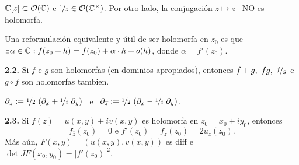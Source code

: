\begin{example}
    \(\mathbb{C}[z]\subset \mathcal{O}(\mathbb{C})\) e \(\nicefrac{1}{z} \in \mathcal{O}(\mathbb{C}^\times)\). Por otro lado, la conjugación \(z \mapsto \overline{z}\) \ NO es holomorfa. 
\end{example}

\begin{note}
    Una reformulación equivalente y útil de ser holomorfa en \(z_0\) es que \(\exists \alpha \in \mathbb{C} : f(z_0 + h) = f(z_0)+ \alpha\cdot h  + o(h) \), donde \(\alpha = f'(z_0)\). 
\end{note}

\begin{proposition}
    \textbf{2.2.} Si \(f\) e \(g\) son holomorfas (en dominios apropiados), entonces \(f+g, \ fg, \ \nicefrac{f}{g}\) e \(g \circ f\) son holomorfas tambien.  
\end{proposition}


\renewcommand{\hom}{\mathcal{L}}

\begin{definition}
    \(\displaystyle \partial_z := \nicefrac{1}{2} \ (\partial_x + \nicefrac{1}{i} \ \partial_y)\) \ e \ \(\displaystyle \partial_{\overline{z}} := \nicefrac{1}{2}\  (\partial_x - \nicefrac{1}{i} \  \partial_y)\).   
\end{definition}

\begin{proposition}
    \textbf{2.3.} Si \(f(z) = u(x,y) + iv(x,y)\) es holomorfa en \(z_0 = x_0 + i y_0\), entonces 
    \[f_{\overline{z}}(z_0) = 0 \text{ \ \ e \ \ } f'(z_0) = f_z(z_0) = 2u_z (z_0).\]
    Más aún, \(F(x,y) = (u(x,y), v(x,y))\) es diff e \(\det JF(x_0,y_0) = |f'(z_0)|^2\). 
\end{proposition}

